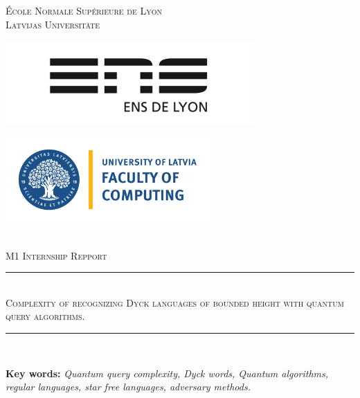 \documentclass[11pt,a4paper]{article}
\newcommand{\HRule}{\rule{\linewidth}{0.5mm}}
\theoremstyle{definition}
\theoremstyle{plain}
\theoremstyle{definition}
\begin{document}
\begin{titlepage}
    \begin{sffamily}
        \begin{center}

            \textsc{\LARGE École Normale Supérieure de Lyon}\\[0.5cm]
            \textsc{\LARGE Latvijas Universitāte} \\[1cm]

            \begin{minipage}[c]{.46\linewidth}
                \hspace{-2cm}
                \includegraphics[width=9.5cm]{illustration/Logo_ENS_Lyon.png}
            \end{minipage}
            \hfill%
            \begin{minipage}[c]{.46\linewidth}
                \centering
                \includegraphics[width=8cm]{illustration/Faculty_of_Computing_University_of_Latvia-1536x619-1.png}
            \end{minipage}\\[1cm]

            \textsc{\Large M1 Internship Repport}\\[1cm]

            \HRule \\[0.4cm]
            \textsc{\huge Complexity of recognizing Dyck languages
                of bounded height with quantum query algorithms.}
            \HRule \\[1cm]

            \begin{center}
                \textbf{Key words:} \textit{Quantum query complexity, Dyck words,
                    Quantum algorithms, regular languages, star free languages,
                    adversary methods.}
            \end{center}


\end{center}
\end{sffamily}
\end{titlepage}
\end{document}
